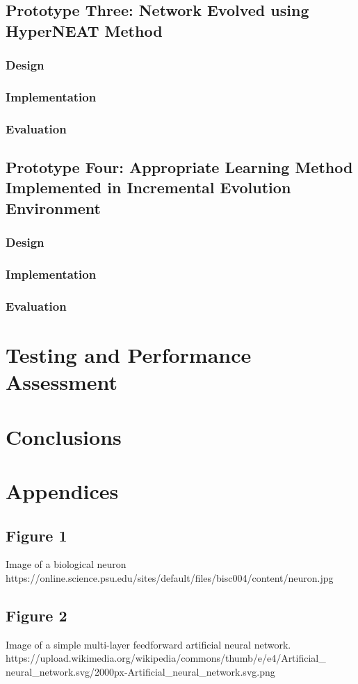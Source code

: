 \documentclass[12pt,a4paper]{article}
\begin{document}
\subsection{Prototype Three: Network Evolved using HyperNEAT Method}
\subsubsection{Design}
\subsubsection{Implementation}
\subsubsection{Evaluation}
\subsection{Prototype Four: Appropriate Learning Method Implemented in Incremental Evolution Environment}
\subsubsection{Design}
\subsubsection{Implementation}
\subsubsection{Evaluation}
\newpage
\section{Testing and Performance Assessment}
\section{Conclusions}
\newpage
\section{Appendices}
\subsection*{Figure 1}
Image of a biological neuron\\
https://online.science.psu.edu/sites/default/files/bisc004/content/neuron.jpg
\subsection*{Figure 2}
Image of a simple multi-layer feedforward artificial neural network.\\
 https://upload.wikimedia.org/wikipedia/commons/thumb/e/e4/Artificial\_ neural\_network.svg/2000px-Artificial\_neural\_network.svg.png
\end{document}
